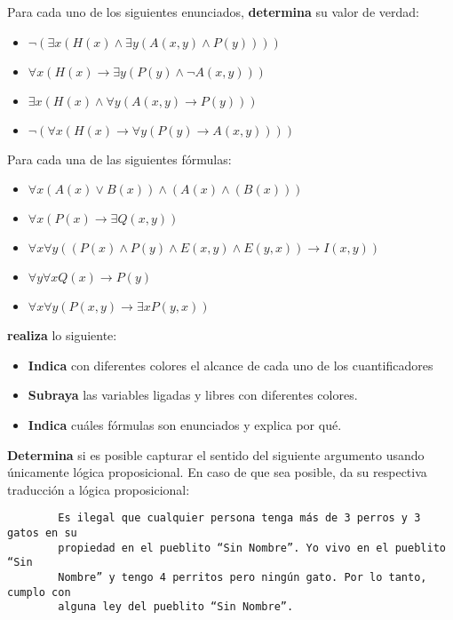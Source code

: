 \documentclass[oneside]{style}
\begin{document}
\begin{questions}[label=\protect\circled{\bfseries\arabic*}]
    Para cada uno de los siguientes enunciados, \textbf{determina} su 
    valor de verdad:
    \begin{itemize}
        \item $\neg (\exists x (H(x) \land \exists y (A(x,y) \land P(y))))$
        \item $\forall x (H(x) \rightarrow \exists y (P(y) \land 
        \neg A(x,y)))$
        \item $\exists x (H(x) \land \forall y (A(x,y) \rightarrow P(y)))$
        \item $\neg (\forall x (H(x) \rightarrow \forall y (P(y) \rightarrow 
        A(x,y))))$
    \end{itemize}

    \question
    {
        Para cada una de las siguientes fórmulas:
        \begin{itemize}
            \item $\forall x (A(x) \lor B(x)) \land (A(x) \land (B(x)))$
            \item $\forall x (P(x) \rightarrow \exists Q(x,y))$
            \item $\forall x \forall y ((P(x) \land P(y) \land E(x,y) \land 
            E(y,x)) \rightarrow I(x,y))$
            \item $\forall y \forall x Q(x) \rightarrow P(y)$        
            \item $\forall x \forall y (P(x,y) \rightarrow \exists x P(y,x))$
        \end{itemize}

        \textbf{realiza} lo siguiente:
        \begin{itemize}
            \item \textbf{Indica} con diferentes colores el alcance de cada uno 
            de los cuantificadores  
            \item \textbf{Subraya} las variables ligadas y libres con diferentes 
            colores. 
            \item \textbf{Indica} cuáles fórmulas son enunciados y explica
            por qué. 
        \end{itemize}
    }

     \question
     {
        \textbf{Determina} si es posible capturar el sentido del siguiente 
        argumento usando únicamente lógica proposicional. En caso de que sea 
        posible, da su respectiva traducción a lógica proposicional:
        \begin{verbatim}
        Es ilegal que cualquier persona tenga más de 3 perros y 3 gatos en su 
        propiedad en el pueblito “Sin Nombre”. Yo vivo en el pueblito “Sin 
        Nombre” y tengo 4 perritos pero ningún gato. Por lo tanto, cumplo con 
        alguna ley del pueblito “Sin Nombre”.
        \end{verbatim}
     }
\end{questions}
\end{document}
